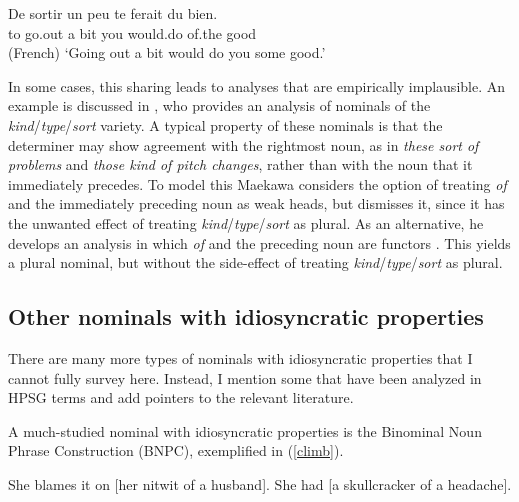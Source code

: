 \documentclass[output=paper,biblatex,babelshorthands,newtxmath,draftmode,colorlinks,citecolor=brown]{langscibook}
\begin{document}
\begin{exe} 
\ex\label{sorti}   
\gll   De sortir un peu te ferait du bien.  \\
       to go.out a bit you would.do of.the good \\\hfill(French)
\trans `Going out a bit would do you some good.'
\end{exe}  

\noindent
In some cases, this sharing leads to analyses that are empirically implausible. 
An example is discussed in \citet{Maekawa15}, who provides  
an analysis of  nominals of the \emph{kind}/\emph{type}/\emph{sort} variety.  
A typical property of these nominals is that the determiner may show agreement with the 
rightmost noun, as in \emph{these sort of problems} and \emph{those kind of pitch changes},
rather than with the noun that it immediately precedes. 
To model this Maekawa considers the option of treating \emph{of} and the immediately 
preceding noun as weak heads, but dismisses it, since it has the unwanted effect of treating 
\emph{kind}/\emph{type}/\emph{sort} as plural. 
As an alternative, he develops an analysis in which \emph{of} and 
the preceding noun are functors \citep[149]{Maekawa15}. This yields a plural nominal, but 
without the side-effect of treating \emph{kind}/\emph{type}/\emph{sort} as plural. 


\subsection{Other nominals with idiosyncratic properties} 
\label{other}

\largerpage
There are many more types of nominals with idiosyncratic properties
that I cannot fully survey here. 
Instead, I mention some that have been analyzed in HPSG terms and add pointers 
to the relevant literature.    

A much-studied nominal with idiosyncratic properties is the Binominal Noun Phrase 
Construction (BNPC), exemplified in (\ref{climb}). 

\begin{exe}
\ex\label{climb}
\begin{xlist}
\ex  She blames it on [her nitwit of a husband]. 
\ex  She had [a skullcracker of a headache]. 
\end{xlist}
\end{exe}
\end{document}
